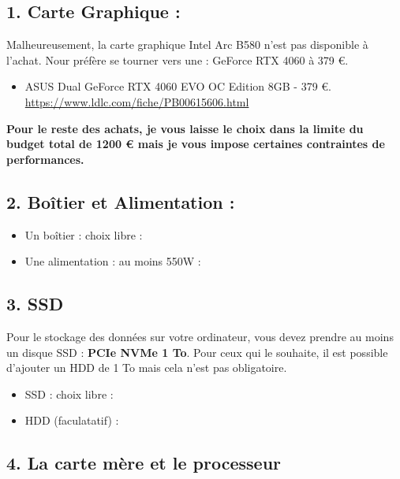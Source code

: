 \subsection*{1. Carte Graphique :} 

Malheureusement, la carte graphique Intel Arc B580 n'est pas disponible à l'achat. Nour préfère se tourner vers une : GeForce RTX 4060 à 379 \euro{}.

\begin{itemize}[label={$\bullet$}]
  \item ASUS Dual GeForce RTX 4060 EVO OC Edition 8GB - 379 \euro{}. \newline \url{https://www.ldlc.com/fiche/PB00615606.html} \\
\end{itemize}

\newpage

\textbf{Pour le reste des achats, je vous laisse le choix dans la limite du budget total de 1200 \euro{} mais je vous impose certaines contraintes de performances.} \\


\subsection*{2. Boîtier et Alimentation :} 

\begin{itemize}[label={$\bullet$}]
  \item Un boîtier : choix libre :  \dotfill
  \item Une alimentation : au moins 550W :  \dotfill
\end{itemize} 

\subsection*{3. SSD } 

Pour le stockage des données sur votre ordinateur, vous devez prendre au moins un disque SSD : \textbf{PCIe NVMe 1 To}. Pour ceux qui le souhaite, il est possible d'ajouter un HDD de 1 To mais cela n'est pas obligatoire. 

\begin{itemize}[label={$\bullet$}]
  \item SSD : choix libre :  \dotfill
  \item HDD (faculatatif) :  \dotfill
\end{itemize} 

\subsection*{4. La carte mère et le processeur} 


